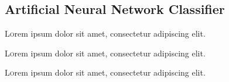 \subsection{Artificial Neural Network Classifier}

\lettrine[nindent=0em,lines=3]{L} orem ipsum dolor sit amet, consectetur adipiscing elit.
\lipsum[2-3] %

\lettrine[nindent=0em,lines=3]{L} orem ipsum dolor sit amet, consectetur adipiscing elit.
\lipsum[2-3] %

\lettrine[nindent=0em,lines=3]{L} orem ipsum dolor sit amet, consectetur adipiscing elit.
\lipsum[2-3] %

